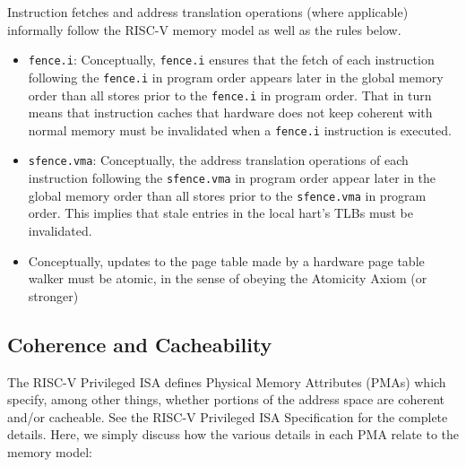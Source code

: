 Instruction fetches and address translation operations (where applicable) informally follow the RISC-V memory model as well as the rules below.
\begin{itemize}
  \item {\tt fence.i}: Conceptually, {\tt fence.i} ensures that the fetch of each instruction following the {\tt fence.i} in program order appears later in the global memory order than all stores prior to the {\tt fence.i} in program order.
    That in turn means that instruction caches that hardware does not keep coherent with normal memory must be invalidated when a {\tt fence.i} instruction is executed.
  \item {\tt sfence.vma}: Conceptually, the address translation operations of each instruction following the {\tt sfence.vma} in program order appear later in the global memory order than all stores prior to the {\tt sfence.vma} in program order.
    This implies that stale entries in the local hart's TLBs must be invalidated.
  \item Conceptually, updates to the page table made by a hardware page table walker must be atomic, in the sense of obeying the Atomicity Axiom (or stronger)
\end{itemize}

\subsection{Coherence and Cacheability}

The RISC-V Privileged ISA defines Physical Memory Attributes (PMAs) which specify, among other things, whether portions of the address space are coherent and/or cacheable.
See the RISC-V Privileged ISA Specification for the complete details.
Here, we simply discuss how the various details in each PMA relate to the memory model:


